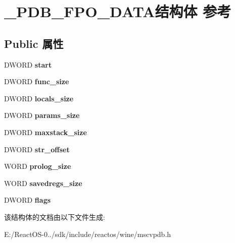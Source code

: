 \hypertarget{struct___p_d_b___f_p_o___d_a_t_a}{}\section{\+\_\+\+P\+D\+B\+\_\+\+F\+P\+O\+\_\+\+D\+A\+T\+A结构体 参考}
\label{struct___p_d_b___f_p_o___d_a_t_a}
\subsection*{Public 属性}
\begin{DoxyCompactItemize}
\item 
\mbox{\label{struct___p_d_b___f_p_o___d_a_t_a_ae6eba6bfdd94d62f30d63c87fee9bbd6}} 
D\+W\+O\+RD {\bfseries start}
\item 
\mbox{\label{struct___p_d_b___f_p_o___d_a_t_a_aa6548f91318b2d330c9511fb68d091f8}} 
D\+W\+O\+RD {\bfseries func\+\_\+size}
\item 
\mbox{\label{struct___p_d_b___f_p_o___d_a_t_a_afa1aec22a9c5edb4a55863d620e01100}} 
D\+W\+O\+RD {\bfseries locals\+\_\+size}
\item 
\mbox{\label{struct___p_d_b___f_p_o___d_a_t_a_aaf182db8eecaa4b9c66cd982e8824158}} 
D\+W\+O\+RD {\bfseries params\+\_\+size}
\item 
\mbox{\label{struct___p_d_b___f_p_o___d_a_t_a_ab83c88c7a6226aa25d1648abfe4097ed}} 
D\+W\+O\+RD {\bfseries maxstack\+\_\+size}
\item 
\mbox{\label{struct___p_d_b___f_p_o___d_a_t_a_a0b2dcefeecb52435b17df324942de13d}} 
D\+W\+O\+RD {\bfseries str\+\_\+offset}
\item 
\mbox{\label{struct___p_d_b___f_p_o___d_a_t_a_a49dec1c708f3de37724bbb503bb625c7}} 
W\+O\+RD {\bfseries prolog\+\_\+size}
\item 
\mbox{\label{struct___p_d_b___f_p_o___d_a_t_a_a213b95363aafe66c6b5cea92b98d8236}} 
W\+O\+RD {\bfseries savedregs\+\_\+size}
\item 
\mbox{\label{struct___p_d_b___f_p_o___d_a_t_a_a844ae86c1a6fcb6d7f49526aef42598e}} 
D\+W\+O\+RD {\bfseries flags}
\end{DoxyCompactItemize}


该结构体的文档由以下文件生成\+:\begin{DoxyCompactItemize}
\item 
E\+:/\+React\+O\+S-\/0../sdk/include/reactos/wine/mscvpdb.\+h\end{DoxyCompactItemize}
